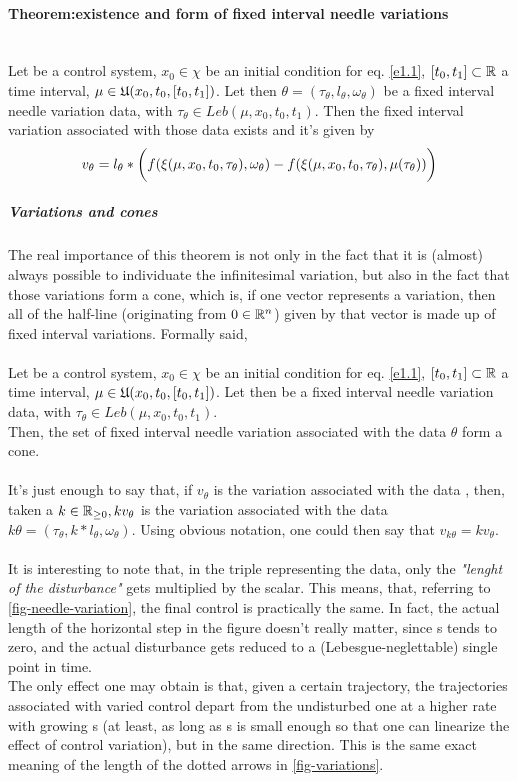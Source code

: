 \paragraph[prop 4.9]{Theorem:existence and form of fixed interval needle variations}\mbox{}\\
Let \controlSystem be a control system, $x_0\in\chi$ be an initial condition for eq. \ref{e1.1}, $[t_0,t_1]\subset\mathbb{R}$ a time interval, $\mu\in\mathfrak{U}(x_0,t_0,[t_0,t_1])$. Let then $\theta=(\tau_\theta,l_\theta,\omega_\theta)$ be a fixed interval needle variation data, with $\tau_\theta\in Leb(\mu,x_0,t_0,t_1)$. Then the fixed interval variation associated with those data exists and it's given by
\[ v_\theta=l_\theta*\bigg(f(\xi(\mu,x_0,t_0,\tau_\theta),\omega_\theta) - f(\xi(\mu,x_0,t_0,\tau_\theta),\mu(\tau_\theta) )  \bigg) \]

\subparagraph[4.10]{Variations and cones} The real importance of this theorem is not only in the fact that it is (almost) always possible to individuate the infinitesimal variation, but also in the fact that those variations form a cone, which is, if one vector represents a variation, then all of the half-line (originating from $0\in\mathbb{R}^n$) given by that vector is made up of fixed interval variations. Formally said, \\\\

 Let \controlSystem be a control system, $x_0\in\chi$ be an initial condition for eq. \ref{e1.1}, $[t_0,t_1]\subset\mathbb{R}$ a time interval, $\mu\in\mathfrak{U}(x_0,t_0,[t_0,t_1])$. Let then \fivData be a fixed interval needle variation data, with $\tau_\theta\in Leb(\mu,x_0,t_0,t_1)$.\\
Then, the set of fixed interval needle variation associated with the data $\theta$ form a cone.\\\\
 It's just enough to say that, if $v_\theta$ is the variation associated with the data \fivData, then, taken a $k\in\mathbb{R}_{\geq0}, kv_\theta$ is the variation associated with the data $k\theta=(\tau_\theta,k*l_\theta,\omega_\theta)$. Using obvious notation, one could then say that $v_{k\theta}=kv_\theta$.\\\\
It is interesting to note that, in the triple representing the data, only the \textit{"lenght of the disturbance"} gets multiplied by the scalar. This means, that, referring to \ref{fig-needle-variation}, the final control is practically the same. In fact, the actual length of the horizontal step in the figure doesn't really matter, since s tends to zero, and the actual disturbance gets reduced to a (Lebesgue-neglettable) single point in time. \\
The only effect one may obtain is that, given a certain trajectory, the trajectories associated with varied control depart from the undisturbed one at a higher rate with growing s (at least, as long as s is small enough so that one can linearize the effect of control variation), but in the same direction. This is the same exact meaning of the length of the dotted arrows in \ref{fig-variations}.


